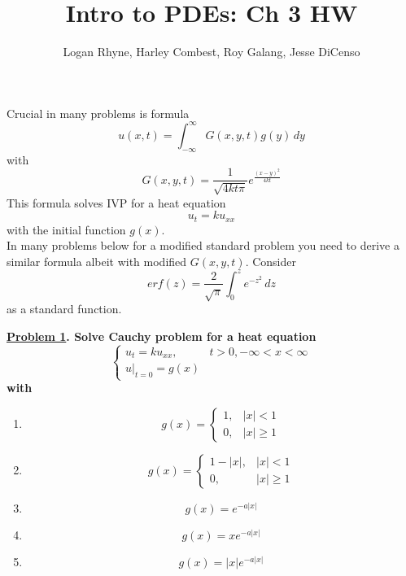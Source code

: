 \documentclass{article}
\title{Intro to PDEs: Ch 3 HW}
\author{Logan Rhyne, Harley Combest, Roy Galang, Jesse DiCenso}
\theoremstyle{definition}
\newenvironment{boldenv}{\bfseries\boldmath}{}
\begin{document}
\maketitle
Crucial in many problems is formula
\[u(x,t)=\int_{-\infty}^{\infty} G(x, y, t)g(y)\,dy\]
with
\[G(x, y, t) = \frac{1}{\sqrt{4kt\pi}}e^{\frac{(x-y)^2}{4kt}}\]
This formula solves IVP for a heat equation
\[u_t=ku_{xx}\]
with the initial function $g(x)$.\\
In many problems below for a modified standard problem you need to derive a similar formula albeit with modified $G(x,y,t)$. Consider
\[erf(z)=\frac{2}{\sqrt{\pi}} \int_0^z e^{-z^2}\,dz\]
as a standard function.

\begin{boldenv}
    \underline{Problem 1}. Solve Cauchy problem for a heat equation
    \[\begin{cases}
        u_t = ku_{xx}, & t > 0, -\infty < x < \infty\\
        u|_{t=0} = g(x)
    \end{cases}\]
    with \begin{enumerate}
        \item \begin{equation*}
        g(x) = \begin{cases}
            1, & |x| < 1\\
            0, & |x| \geq 1
        \end{cases}
        \end{equation*}
        \item \begin{equation*}
        g(x) = \begin{cases}
            1-|x|, & |x| < 1\\
            0, & |x| \geq 1
        \end{cases}
        \end{equation*}
        \item \[g(x) = e^{-a|x|}\]
        \item \[g(x) = xe^{-a|x|}\]
        \item \[g(x) = |x|e^{-a|x|}\]
    \end{enumerate}
\end{boldenv}
\end{document}
